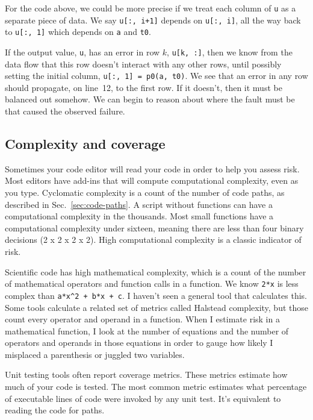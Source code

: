 \documentclass[fleqn,10pt]{olplainarticle}
\begin{document}
For the code above, we could be more precise if
we treat each column of \lstinline|u|
as a separate piece of data. We say \lstinline|u[:, i+1]|
depends on \lstinline|u[:, i]|, all the way back to 
\lstinline|u[:, 1]| which depends on \lstinline|a| and
\lstinline|t0|.

If the output value, \lstinline|u|, has an error in row $k$,
\lstinline|u[k, :]|, then we know from the data flow that
this row doesn't interact with any other rows, until possibly
setting the initial column, \lstinline|u[:, 1] = p0(a, t0)|.
We see that an error in any row should propagate, on line~12,
to the first row. If it doesn't, then it must be balanced out
somehow. We can begin to reason about where the fault must
be that caused the observed failure.


\subsection{Complexity and coverage}

Sometimes your code editor will read your code in order to help
you assess risk. Most editors have add-ins that will compute
computational complexity, even as you type. Cyclomatic complexity
is a count of the number of code paths, as described in Sec.~\ref{sec:code-paths}. A script without functions can have a computational
complexity in the thousands. Most small functions have a computational
complexity under sixteen, meaning there are less than four binary
decisions (2 x 2 x 2 x 2). High computational complexity is a
classic indicator of risk.

Scientific code has high mathematical complexity, which is a count
of the number of mathematical operators and function calls in a
function. We know \lstinline|2*x| is less complex than
\lstinline|a*x^2 + b*x + c|.
I haven't seen a general tool that calculates this. Some tools
calculate a related set of metrics called Halstead complexity,
but those count every operator and operand in a function.
When I estimate risk in a mathematical function, I look at
the number of equations and the number of operators and operands
in those equations in order to gauge how likely I misplaced a
parenthesis or juggled two variables.

Unit testing tools often report coverage metrics. These metrics
estimate how much of your code is tested. The most common metric
estimates what percentage of executable lines of code were invoked
by any unit test. It's equivalent to reading the code for paths.
\end{document}
